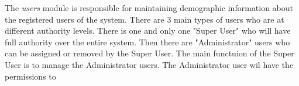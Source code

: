 The \textit{users} module is responsible for maintaining demographic information
about the registered users of the system. There are 3 main types of users who
are at different authority levels. There is one and only one "Super User" who
will have full authority over the entire system. Then there are "Administrator"
users who can be assigned or removed by the Super User. The main functuion of
the Super User is to manage the Administrator users. The Administrator user
wil have the permissions to
